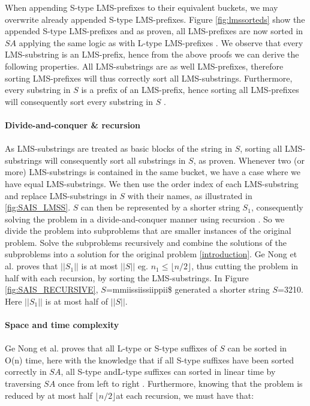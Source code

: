 \documentclass[12pt]{article} %
\begin{document}
When appending S-type LMS-prefixes to their equivalent buckets, we may overwrite already appended S-type LMS-prefixes. Figure \ref{fig:lmssorteds} show the appended S-type LMS-prefixes and as proven, all LMS-prefixes are now sorted in $SA$ applying the same logic as with L-type LMS-prefixes \cite{twoeffecient}. We observe that every LMS-substring is an LMS-prefix, hence from the above proofs we can derive the following properties. All LMS-substrings are as well LMS-prefixes, therefore sorting LMS-prefixes will thus correctly sort all LMS-substrings. Furthermore, every substring in $S$ is a prefix of an LMS-prefix, hence sorting all LMS-prefixes will consequently sort every substring in $S$ \cite{twoeffecient}.
\\ \\
\textbf{Divide-and-conquer \& recursion}
\\ \\
As LMS-substrings are treated as basic blocks of the string in $S$, sorting all LMS-substrings will consequently sort all substrings in $S$, as proven. Whenever two (or more) LMS-substrings is contained in the same bucket, we have a case where we have equal LMS-substrings. We then use the order index of each LMS-substring and replace LMS-substrings in $S$ with their names, as illustrated in \ref{fig:SAIS_LMSS}. $S$ can then be represented by a shorter string $S_1$, consequently solving the problem in a divide-and-conquer manner using recursion \cite{twoeffecient}. So we divide the problem into subproblems that are smaller instances of the original problem. Solve the subproblems recursively and combine the solutions of the subproblems into a solution for the original problem \ref{introduction}.
Ge Nong et al. \cite{twoeffecient} proves that $||S_1||$ is at most $||S||$ eg. $n_1 \leq \lfloor n/2 \rfloor$, thus cutting the problem in half with each recursion, by sorting the LMS-substrings. In Figure \ref{fig:SAIS_RECURSIVE}, $S$=mmiissiissiippii\$ generated a shorter string $S$=3210. Here $||S_1||$ is at most half of $||S||$.
\\ \\
\textbf{Space and time complexity}
\\ \\
Ge Nong et al. \cite{twoeffecient} proves that all L-type or S-type suffixes of $S$ can be sorted in O(n) time, here with the knowledge that if all S-type suffixes have been sorted correctly in $SA$, all S-type andL-type suffixes can sorted in linear time by traversing $SA$ once from left to right \cite{twoeffecient}. Furthermore, knowing that the problem is reduced by at most half  $\lfloor n/2 \rfloor$at each recursion, we must have that:
\end{document}
